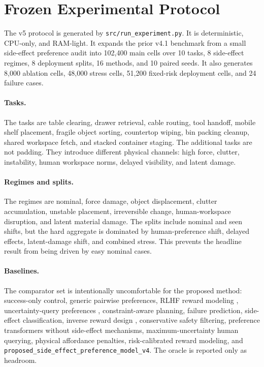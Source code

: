 \documentclass{article}
\begin{document}
\section{Frozen Experimental Protocol}
The v5 protocol is generated by \texttt{src/run\_experiment.py}. It is deterministic, CPU-only, and RAM-light. It expands the prior v4.1 benchmark from a small side-effect preference audit into 102,400 main cells over 10 tasks, 8 side-effect regimes, 8 deployment splits, 16 methods, and 10 paired seeds. It also generates 8,000 ablation cells, 48,000 stress cells, 51,200 fixed-risk deployment cells, and 24 failure cases.



\paragraph{Tasks.}
The tasks are table clearing, drawer retrieval, cable routing, tool handoff, mobile shelf placement, fragile object sorting, countertop wiping, bin packing cleanup, shared workspace fetch, and stacked container staging. The additional tasks are not padding. They introduce different physical channels: high force, clutter, instability, human workspace norms, delayed visibility, and latent damage.

\paragraph{Regimes and splits.}
The regimes are nominal, force damage, object displacement, clutter accumulation, unstable placement, irreversible change, human-workspace disruption, and latent material damage. The splits include nominal and seen shifts, but the hard aggregate is dominated by human-preference shift, delayed effects, latent-damage shift, and combined stress. This prevents the headline result from being driven by easy nominal cases.

\paragraph{Baselines.}
The comparator set is intentionally uncomfortable for the proposed method: success-only control, generic pairwise preferences, RLHF reward modeling \citep{christiano2017deep}, uncertainty-query preferences \citep{sadigh2017active,wilson2012bayesian}, constraint-aware planning, failure prediction, side-effect classification, inverse reward design \citep{hadfieldmenell2017inverse}, conservative safety filtering, preference transformers without side-effect mechanisms, maximum-uncertainty human querying, physical affordance penalties, risk-calibrated reward modeling, and \texttt{proposed\_side\_effect\_preference\_model\_v4}. The oracle is reported only as headroom.
\end{document}
